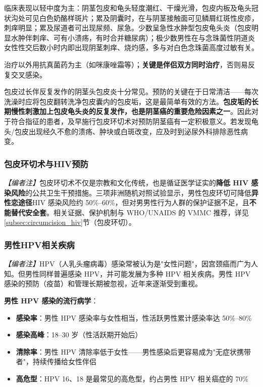 \documentclass[12pt,a4paper,twoside]{ctexbook}
\begin{document}
临床表现以轻中度为主：阴茎包皮和龟头轻度潮红、干燥光滑，包皮内板及龟头冠状沟处可见白色奶酪样斑片；累及阴囊时，在与阴茎接触面可见鳞屑红斑性皮疹，刺痒明显；累及尿道者可出现尿频、尿急。少数呈急性水肿型包皮龟头炎（包皮明显水肿伴刺痒、可有小溃疡，有时合并糖尿病）；极少数男性在与念珠菌性阴道炎女性性交后数小时内即出现阴茎刺痒、烧灼感，多与对白色念珠菌高度过敏有关。

治疗以外用抗真菌药为主（如咪康唑霜等）；\textbf{关键是伴侣双方同时治疗}，否则易反复交叉感染。

\begin{tcolorbox}[colback=pink!5!white,colframe=red!50!black,title=贴心小叮咛]
包皮过长伴反复发作的阴茎头包皮炎十分常见。预防的关键在于日常清洁——每次洗澡时应将包皮翻转洗净包皮囊内的包皮垢，这是最简单有效的方法。\textbf{包皮垢的长期慢性刺激加上包皮龟头炎的反复发作，也是阴茎癌的重要危险因素之一}。因此对于符合指征的患者，及早施行包皮环切术对预防阴茎癌有一定积极意义。若发现龟头/包皮出现经久不愈的溃疡、肿块或白斑改变，应及时到泌尿外科排除恶性病变。
\end{tcolorbox}

\subsubsection{包皮环切术与HIV预防}

\noindent\textit{【编者注】}包皮环切术不仅是宗教和文化传统，也是循证医学证实的\textbf{降低 HIV 感染风险}的公共卫生干预措施。三项非洲随机对照试验显示，男性包皮环切可降低\textbf{异性恋途径}HIV 感染风险约 50\%--60\%，但对男男性行为人群的保护证据不足，且\textbf{不能替代安全套}。相关证据、保护机制与 WHO/UNAIDS 的 VMMC 推荐，详见\ref{subsec:circumcision_hiv}节（包皮环切）。

\subsubsection{男性HPV相关疾病}
\label{subsec:male_hpv}

\noindent\textit{【编者注】}HPV（人乳头瘤病毒）感染常被认为是"女性问题"，因宫颈癌而广为人知。但男性同样普遍感染 HPV，并可能发展为多种 HPV 相关疾病。男性 HPV 感染的预防（疫苗）和管理长期被忽视，近年来逐渐受到重视。

\vspace{0.5em}
\noindent\textbf{男性 HPV 感染的流行病学}：

\begin{itemize}[leftmargin=2cm]
	\item \textbf{感染率}：男性 HPV 感染率与女性相当，性活跃男性累计感染率达 50\%--80\%
	\item \textbf{感染高峰}：18--30 岁（性活跃期开始后）
	\item \textbf{清除率}：男性 HPV 清除率低于女性——男性感染后更容易成为"无症状携带者"，持续传播给女性伴侣
	\item \textbf{高危型}：HPV 16、18 是最常见的高危型，约占男性 HPV 相关癌症的 70\%
\end{itemize}
\end{document}
